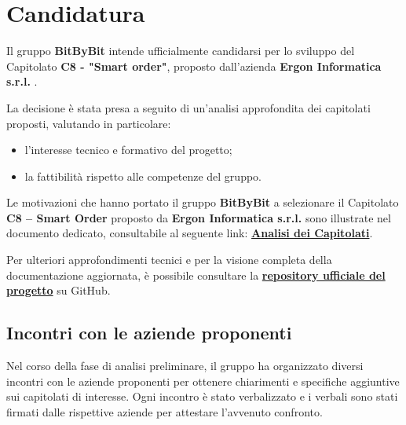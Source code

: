 \documentclass[a4paper,12pt]{article}
\begin{document}
\vspace*{\fill}

\clearpage

\clearpage
\tableofcontents
\thispagestyle{empty} %
\clearpage


\section{Candidatura}
Il gruppo \textbf{BitByBit} intende ufficialmente candidarsi per lo sviluppo del Capitolato \textbf{C8 - "Smart order"}, proposto dall’azienda \textbf{Ergon Informatica s.r.l.} .

La decisione è stata presa a seguito di un’analisi approfondita dei capitolati proposti, valutando in particolare:
\begin{itemize}
    \item l’interesse tecnico e formativo del progetto;
    \item la fattibilità rispetto alle competenze del gruppo.
\end{itemize}


Le motivazioni che hanno portato il gruppo \textbf{BitByBit} a selezionare il Capitolato \textbf{C8 – Smart Order} proposto da \textbf{Ergon Informatica s.r.l.} sono illustrate nel documento dedicato, consultabile al seguente link:  
\href{https://github.com/SWE-BitByBit/SWE-project/blob/d1ed2df7ab879a4755811d7b17a54d737cb9af04/candidatura/Valutazione_capitolati.pdf}{\textbf{Analisi dei Capitolati}}.

Per ulteriori approfondimenti tecnici e per la visione completa della documentazione aggiornata, è possibile consultare la \href{https://github.com/SWE-BitByBit/SWE-project.git}{\textbf{repository ufficiale del progetto}} su GitHub.

\subsection{Incontri con le aziende proponenti}

Nel corso della fase di analisi preliminare, il gruppo ha organizzato diversi incontri con le aziende proponenti per ottenere chiarimenti e specifiche aggiuntive sui capitolati di interesse.  
Ogni incontro è stato verbalizzato e i verbali sono stati firmati dalle rispettive aziende per attestare l’avvenuto confronto.
\end{document}
